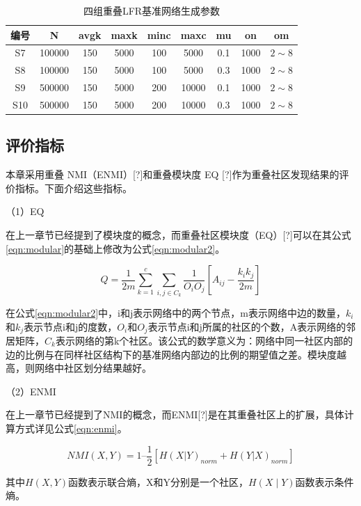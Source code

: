 \begin{table}
  \centering
  \caption{四组重叠LFR基准网络生成参数} \label{tab:tab4-1}
  \begin{tabular*}{0.9\textwidth}{@{\extracolsep{\fill}}ccccccccc}
  \toprule
    编号		&N  &avgk &maxk &minc &maxc &mu &on &om\\
  \midrule
    S7	&100000  &150 &5000 &100 &5000 &0.1 &1000 &$2\sim 8$\\
    S8 &100000  &150 &5000 &100 &5000 &0.3 &1000 &$2\sim 8$\\
    S9 &500000  &150 &5000 &200 &10000 &0.1 &1000 &$2\sim 8$\\
    S10 &500000  &150 &5000 &200 &10000 &0.3 &1000 &$2\sim 8$\\
  \bottomrule
  \end{tabular*}
\end{table}

\subsection{评价指标}
本章采用重叠 NMI（ENMI）[?]和重叠模块度 EQ
[?]作为重叠社区发现结果的评价指标。下面介绍这些指标。

（1）EQ

在上一章节已经提到了模块度的概念，而重叠社区模块度（EQ）[?]可以在其公式\ref{eqn:modular}的基础上修改为公式\ref{eqn:modular2}。

\begin{equation}
  \label{eqn:modular2}
  Q=\frac{1}{2m} \sum_{k=1}^c \sum_{i,j \in C_k} \frac{1}{O_iO_j} \left [ A_{ij}-\frac{k_ik_j}{2m} \right ]  
\end{equation}

在公式\ref{eqn:modular2}中，i和j表示网络中的两个节点，m表示网络中边的数量，$k_i$和$k_j$表示节点i和j的度数，$O_i$和$O_j$表示节点i和j所属的社区的个数，A表示网络的邻居矩阵，$C_k$表示网络的第k个社区。该公式的数学意义为：网络中同一社区内部的边的比例与在同样社区结构下的基准网络内部边的比例的期望值之差。模块度越高，则网络中社区划分结果越好。


（2）ENMI

在上一章节已经提到了NMI的概念，而ENMI[?]是在其重叠社区上的扩展，具体计算方式详见公式\ref{eqn:enmi}。

\begin{equation}
  \label{eqn:enmi}
  NMI(X,Y) = 1 – \frac{1}{2} [H(X|Y)_{norm} + H(Y|X)_{norm}]
\end{equation}

其中$H(X,Y)$函数表示联合熵，X和Y分别是一个社区，$H(X \mid Y)$函数表示条件熵。

